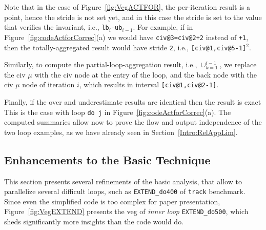 \documentclass{sig-alternate}
\begin{document}
Note that in the case of Figure~\ref{fig:VegACTFOR},
the per-iteration result is a point, hence the stride is not set yet, and in
this case the stride is set to the value that verifies the invariant,
i.e., {\tt lb$_i$-ub$_{i-1}$}.
For example, if in Figure~\ref{fig:codeActforCorrec}(a) we would have 
{\tt civ@3=civ@2+2} instead of {\tt +1}, then the totally-aggregated
result would have stride {\tt 2}, i.e., {\tt [civ@1,civ@5-1]$^2$}.

Similarly, to compute the partial-loop-aggregation result, i.e., $\cup_{k=1}^{i-1}$,
we replace the {\sc civ} $\mu$ with the {\sc civ} node at the entry of the loop,
and the back node with the {\sc civ} $\mu$ node of iteration $i$, 
which results in interval {\tt[civ@1,civ@2-1]}.

Finally, if the over and underestimate results are identical then the result is
exact 
This is the case with loop {\tt do j} in Figure~\ref{fig:codeActforCorrec}(a).  
%
The computed summaries allow now to prove the flow and output independence of the 
two loop examples, as we have already seen in Section~\ref{Intro:RelAppLim}.

\enlargethispage{\baselineskip}

\subsection{Enhancements to the Basic Technique}
\label{subsec:Track}


This section presents several refinements of the basic analysis,
that allow to parallelize several difficult loops, such as {\tt EXTEND\_do400} 
of {\tt track} benchmark. Since even the simplified code
is too complex for paper presentation, Figure~\ref{fig:VegEXTEND} presents the 
{\sc veg} of {\em inner loop} {\tt EXTEND\_do500}, which sheds significantly more 
insights than the code would do.
\end{document}
